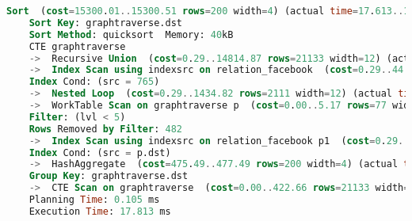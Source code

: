 \begin{lstlisting}[language=SQL,caption = Ausführungsplan Standard SQL,frame=single, label={2.AusführungsplanCTEFacebook.listing} ]
    Sort  (cost=15300.01..15300.51 rows=200 width=4) (actual time=17.613..17.622 rows=321 loops=1)
    Sort Key: graphtraverse.dst
    Sort Method: quicksort  Memory: 40kB
    CTE graphtraverse
    ->  Recursive Union  (cost=0.29..14814.87 rows=21133 width=12) (actual time=0.016..15.903 rows=6056 loops=1)
    ->  Index Scan using indexsrc on relation_facebook  (cost=0.29..44.00 rows=23 width=12) (actual time=0.015..0.020 rows=27 loops=1)
    Index Cond: (src = 765)
    ->  Nested Loop  (cost=0.29..1434.82 rows=2111 width=12) (actual time=0.019..2.130 rows=8173 loops=5)
    ->  WorkTable Scan on graphtraverse p  (cost=0.00..5.17 rows=77 width=8) (actual time=0.017..0.069 rows=729 loops=5)
    Filter: (lvl < 5)
    Rows Removed by Filter: 482
    ->  Index Scan using indexsrc on relation_facebook p1  (cost=0.29..18.23 rows=27 width=8) (actual time=0.001..0.002 rows=11 loops=3645)
    Index Cond: (src = p.dst)
    ->  HashAggregate  (cost=475.49..477.49 rows=200 width=4) (actual time=17.548..17.571 rows=321 loops=1)
    Group Key: graphtraverse.dst
    ->  CTE Scan on graphtraverse  (cost=0.00..422.66 rows=21133 width=4) (actual time=0.017..16.771 rows=6056 loops=1)
    Planning Time: 0.105 ms
    Execution Time: 17.813 ms
\end{lstlisting}

